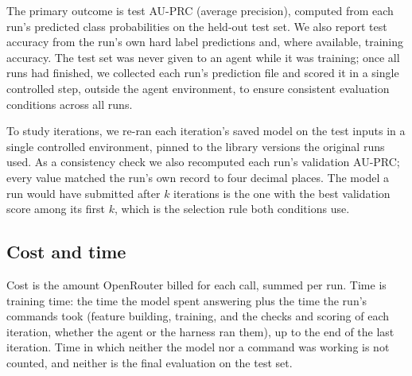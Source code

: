 The primary outcome is test AU-PRC (average precision), computed from each run's predicted class probabilities on the held-out test set. We also report test accuracy from the run's own hard label predictions and, where available, training accuracy. The test set was never given to an agent while it was training; once all runs had finished, we collected each run's prediction file and scored it in a single controlled step, outside the agent environment, to ensure consistent evaluation conditions across all runs.

To study iterations, we re-ran each iteration's saved model on the test inputs in a single controlled environment,
pinned to the library versions the original runs used. As a consistency check we also recomputed each run's validation AU-PRC; every value
matched the run's own record to four decimal places. The model a run would have submitted after $k$ iterations is the
one with the best validation score among its first $k$, which is the selection rule both conditions use.

\subsection{Cost and time}\label{sec:accounting}

Cost is the amount OpenRouter billed for each call, summed per run. Time is training time: the time the model spent
answering plus the time the run's commands took (feature building, training, and the checks and scoring of each
iteration, whether the agent or the harness ran them), up to the end of the last iteration. Time in which neither the
model nor a command was working is not counted, and neither is the final evaluation on the test set.
